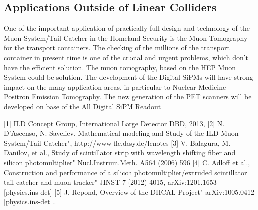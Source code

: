\subsection{Applications Outside of Linear Colliders}
One of the important application of practically full design and technology of the Muon System/Tail Catcher in the Homeland Security is the Muon Tomography for the transport containers. The checking of the millions of the transport container in present time is one of the crucial and urgent problems, which don’t have the efficient solution. The muon tomography, based on the HEP Muon System could be solution. The development of the Digital SiPMs will have strong impact on the many application areas, in particular to Nuclear Medicine – Positron Emission Tomography.  The new generation of the PET scanners will be developed on base of the All Digital SiPM Readout


[1]	ILD Concept Group, International Large Detector DBD, 2013,
[2]	N. D'Ascenso, N. Saveliev, Mathematical modeling and Study of the ILD Muon System/Tail Catcher", http://www-flc.desy.de/lcnotes
[3]	V. Balagura, M. Danilov, et al., Study of scintillator strip with wavelength shifting fiber and silicon photomultiplier" Nucl.Instrum.Meth. A564 (2006) 596
[4]	C. Adloff et al., Construction and performance of a silicon photomultiplier/extruded scintillator tail-catcher and muon tracker" JINST 7 (2012) 4015, arXiv:1201.1653 [physics.ins-det]
[5]	J. Repond, Overview of the DHCAL Project" arXiv:1005.0412 [physics.ins-det]..
